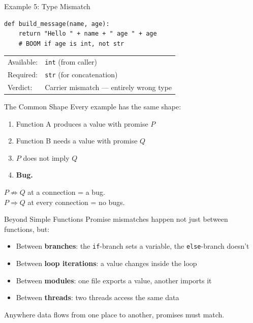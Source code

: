 \documentclass[aspectratio=169,10pt]{beamer}
\newcommand{\hint}[1]{\begin{center}
  \colorbox{hintbg}{\parbox{0.88\textwidth}{\centering\small #1}}\end{center}}
\begin{document}
\begin{frame}[fragile]{Example 5: Type Mismatch}
\begin{lstlisting}
def build_message(name, age):
    return "Hello " + name + " age " + age
    # BOOM if age is int, not str
\end{lstlisting}
\vspace{0.3em}
\begin{tabular}{@{}ll@{}}
Available: & \texttt{int} (from caller) \\
Required:  & \texttt{str} (for concatenation) \\
Verdict:   & \textcolor{danger}{Carrier mismatch --- entirely wrong type} \\
\end{tabular}
\end{frame}

\begin{frame}{The Common Shape}
Every example has the same shape:
\vspace{0.5em}
\begin{enumerate}
  \item Function A produces a value with promise $P$
  \item Function B needs a value with promise $Q$
  \item $P$ does not imply $Q$
  \item \textbf{Bug.}
\end{enumerate}
\vspace{0.5em}
\hint{$P \not\Rightarrow Q$ at a connection = a bug.\\
$P \Rightarrow Q$ at every connection = no bugs.}
\end{frame}

\begin{frame}{Beyond Simple Functions}
Promise mismatches happen not just between functions, but:
\vspace{0.3em}
\begin{itemize}
  \item Between \textbf{branches}: the \texttt{if}-branch sets a variable, the \texttt{else}-branch doesn't
  \item Between \textbf{loop iterations}: a value changes inside the loop
  \item Between \textbf{modules}: one file exports a value, another imports it
  \item Between \textbf{threads}: two threads access the same data
\end{itemize}
\vspace{0.3em}
Anywhere data flows from one place to another, promises must match.
\end{frame}
\end{document}
